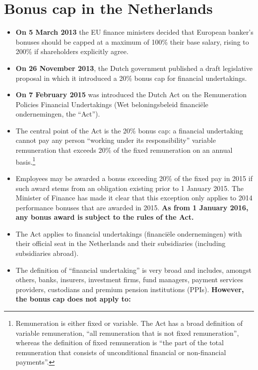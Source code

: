 \documentclass[12pt]{article}
\begin{document}
\section{Bonus cap in the Netherlands} \label{bonus_cap}



\begin{itemize}
	\item \textbf{On 5 March 2013} the EU finance ministers decided that European banker's bonuses should be capped at a maximum of 100\% their base salary, rising to 200\% if shareholders explicitly agree. 
	\item \textbf{On 26 November 2013}, the Dutch government published a draft legislative proposal in which it introduced a 20\% bonus
	cap for financial undertakings. 
	\item \textbf{On 7 February 2015} was introduced the Dutch Act on the Remuneration Policies Financial Undertakings (Wet beloningsbeleid financiële ondernemingen, the ``Act'').
	\item The central point of the Act is the 20\% bonus cap: a financial undertaking cannot pay any person ``working under its responsibility'' variable remuneration that exceeds 20\% of the fixed remuneration on an annual
	basis.\footnote{Remuneration is either fixed or variable. The Act has a broad definition of variable remuneration, ``all remuneration that is not fixed remuneration'', whereas the definition of fixed remuneration is ``the part of the total remuneration that consists of unconditional financial or non-financial payments''.}
	\item Employees may be awarded a bonus exceeding 20\% of the fixed pay in 2015 if such award stems from an obligation existing prior to 1 January 2015. The Minister of Finance has made it clear that this exception only applies to 2014 performance bonuses that are awarded in 2015.\textbf{ As from 1 January 2016, any bonus award is subject to the rules of the Act.}
	\item The Act applies to financial undertakings (financiële ondernemingen) with their official seat in the Netherlands and their subsidiaries (including subsidiaries abroad).
	\item The definition of ``financial undertaking'' is very broad and includes, amongst others, banks, insurers, investment firms, fund managers, payment services providers, custodians and premium pension institutions (PPIs). \textbf{However, the bonus cap does not apply to:}

\end{itemize}
\end{document}
